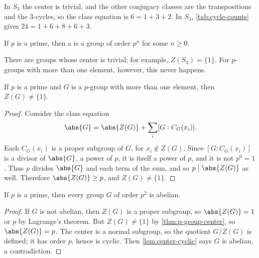 \begin{eg}
	In \(S_3\) the center is trivial, and the other conjugacy classes are the transpositions
	and the \(3\)-cycles, so the class equation is \(6 = 1 + 3 + 2\). In \(S_4\),
	\autoref{tab:cycle-counts} gives \(24 = 1 + 6 + 8 + 6 + 3\).
\end{eg}

\begin{definition}[\(p\)-group]
	If \(p\) is a prime, then a  is a group of order \(p^n\) for some
	\(n \geq 0\).
\end{definition}

There are groups whose center is trivial; for example, \(Z(S_3) = \{1\}\). For
\(p\)-groups with more than one element, however, this never happens.

\begin{theorem}\label{thm:p-group-center}
	If \(p\) is a prime and \(G\) is a \(p\)-group with more than one element, then
	\(Z(G) \neq \{1\}\).
\end{theorem}

\begin{proof}
	Consider the class equation
	\[
		\abs{G} = \abs{Z(G)} + \sum_i [G : C_G(x_i)].
	\]
	Each \(C_G(x_i)\) is a proper subgroup of \(G\), for \(x_i \notin Z(G)\). Since
	\([G : C_G(x_i)]\) is a divisor of \(\abs{G}\), a power of \(p\), it is itself a power of
	\(p\), and it is not \(p^0 = 1\). Thus \(p\) divides \(\abs{G}\) and each term of the
	sum, and so \(p \mid \abs{Z(G)}\) as well. Therefore \(\abs{Z(G)} \geq p\), and
	\(Z(G) \neq \{1\}\).
\end{proof}

\begin{corollary}\label{cor:p2-abelian}
	If \(p\) is a prime, then every group \(G\) of order \(p^2\) is abelian.
\end{corollary}

\begin{proof}
	If \(G\) is not abelian, then \(Z(G)\) is a proper subgroup, so
	\(\abs{Z(G)} = 1\) or \(p\) by Lagrange's theorem. But \(Z(G) \neq \{1\}\) by
	\autoref{thm:p-group-center}, so \(\abs{Z(G)} = p\). The center is a normal subgroup,
	so the quotient \(G/Z(G)\) is defined; it has order \(p\), hence is cyclic. Then
	\autoref{lem:center-cyclic} says \(G\) is abelian, a contradiction.
\end{proof}

